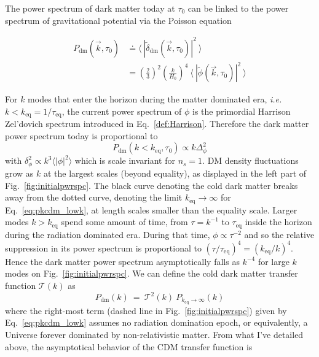 The power spectrum of dark matter today at $\tau_0$ can be linked to the power spectrum of gravitational potential via the Poisson equation

\begin{align*}
P_{\mathrm{dm}} (\vec{k}, \tau_0) &\doteq \langle ~ \left\vert \tilde{\delta}_{\mathrm{dm}} (\vec{k}, \tau_0) \right\vert^2 ~ \rangle \\
&= \left( \frac{2}{3} \right)^2 \left( \frac{k}{H_0} \right)^{4} ~ \langle ~ \left\vert \tilde{\phi} (\vec{k}, \tau_0) \right\vert^2 ~ \rangle
\end{align*}

For $k$ modes that enter the horizon during the matter dominated era, \textit{i.e.} $k < k_{\mathrm{eq}} = 1 / \tau_{\mathrm{eq}}$, the current power spectrum of $\phi$ is the primordial Harrison Zel'dovich spectrum introduced in Eq.~\ref{def:Harrison}. Therefore the dark matter power spectrum today is proportional to\\
\begin{equation}
\label{eq:pkcdm_lowk}
P_{\mathrm{dm}} (k < k_{\mathrm{eq}}, \tau_0) \propto k \Delta^2_\phi
\end{equation} with $\delta^2_\phi \propto k^3 \langle \vert \phi \vert^2 \rangle$ which is scale invariant for $n_s = 1$. DM density fluctuations grow as $k$ at the largest scales (beyond equality), as displayed in the left part of Fig.~\ref{fig:initialpwrspc}. The black curve denoting the cold dark matter breaks away from the dotted curve, denoting the limit $k_{\mathrm{eq}} \rightarrow \infty$ for Eq.~\ref{eq:pkcdm_lowk}, at length scales smaller than the equality scale. Larger modes $k > k_{\mathrm{eq}}$ spend some amount of time, from $\tau = k^{-1}$ to $\tau_{\mathrm{eq}}$ inside the horizon during the radiation dominated era. During that time, $\phi \propto \tau^{-2}$ and so the relative suppression in its power spectrum is proportional to $(\tau / \tau_{\mathrm{eq}})^4 = (k_{\mathrm{eq}}/k)^4$. Hence the dark matter power spectrum asymptotically falls as $k^{-4}$ for large $k$ modes on Fig.~\ref{fig:initialpwrspc}. We can define the cold dark matter transfer function $\mathcal{T}(k)$ as
\begin{equation}
\label{def:cdm_tf}
P_{\mathrm{dm}} (k) ~ = ~ \mathcal{T}^2 (k) ~ P_{k_{\mathrm{eq}} \rightarrow \infty} (k)
\end{equation} where the right-most term (dashed line in Fig.~\ref{fig:initialpwrspc}) given by Eq.~\ref{eq:pkcdm_lowk} assumes no radiation domination epoch, or equivalently, a Universe forever dominated by non-relativistic matter. From what I've detailed above, the asymptotical behavior of the CDM transfer function is 

